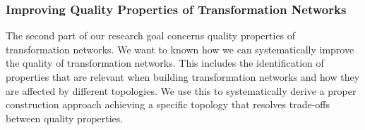 


\subsubsection*{Improving Quality Properties of Transformation Networks}

The second part of our research goal concerns quality properties of transformation networks.
We want to known how we can systematically improve the quality of transformation networks. 
This includes the identification of properties that are relevant when building transformation networks and how they are affected by different topologies. 
We use this to systematically derive a proper construction approach achieving a specific topology that resolves trade-offs between quality properties. 

